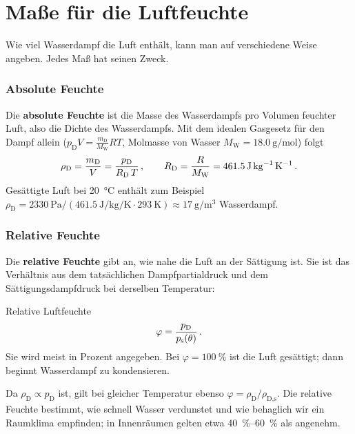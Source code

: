 \section{Maße für die Luftfeuchte}\label{sec: feuchtemasse}
Wie viel Wasserdampf die Luft enthält, kann man auf verschiedene Weise angeben. Jedes Maß hat seinen Zweck.

\subsubsection*{Absolute Feuchte}
Die \textbf{absolute Feuchte} ist die Masse des Wasserdampfs pro Volumen feuchter Luft, also die Dichte des Wasserdampfs. Mit dem idealen Gasgesetz für den Dampf allein ($p_\text{D} V = \frac{m_\text{D}}{M_\text{W}} R T$, Molmasse von Wasser $M_\text{W} = \SI{18.0}{\gram\per\mol}$) folgt
\begin{equation}\label{eq: absolute_feuchte}
    \rho_\text{D} = \frac{m_\text{D}}{V} = \frac{p_\text{D}}{R_\text{D}\, T} \,{,}\, \qquad R_\text{D} = \frac{R}{M_\text{W}} = \SI{461.5}{\joule\per\kilogram\per\kelvin} \,.
\end{equation}
Gesättigte Luft bei \SI{20}{\celsius} enthält zum Beispiel $\rho_\text{D} = \SI{2330}{\pascal}/(\SI{461.5}{\joule\per\kilogram\per\kelvin} \cdot \SI{293}{\kelvin}) \approx \SI{17}{\gram\per\meter\cubed}$ Wasserdampf.

\subsubsection*{Relative Feuchte}
Die \textbf{relative Feuchte} gibt an, wie nahe die Luft an der Sättigung ist. Sie ist das Verhältnis aus dem tatsächlichen Dampfpartialdruck und dem Sättigungsdampfdruck bei derselben Temperatur:
\begin{rememberbox}{Relative Luftfeuchte}
    \begin{equation}\label{eq: relative_feuchte}
        \varphi = \frac{p_\text{D}}{p_\text{s}(\theta)} \,.
    \end{equation}
    Sie wird meist in Prozent angegeben. Bei $\varphi = \SI{100}{\percent}$ ist die Luft gesättigt; dann beginnt Wasserdampf zu kondensieren.
\end{rememberbox}
Da $\rho_\text{D} \propto p_\text{D}$ ist, gilt bei gleicher Temperatur ebenso $\varphi = \rho_\text{D}/\rho_\text{D,s}$. Die relative Feuchte bestimmt, wie schnell Wasser verdunstet und wie behaglich wir ein Raumklima empfinden; in Innenräumen gelten etwa \SIrange{40}{60}{\percent} als angenehm.

